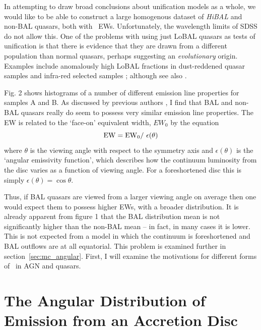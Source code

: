 In attempting to draw broad conclusions about unification models as a whole,
we would like to be able to construct a large homogenous dataset of 
{\em HiBAL} and non-BAL quasars, both with \oiiifull\ EWs. Unfortunately,
the wavelength limits of SDSS do not allow this. One of the problems with
using just LoBAL quasars as tests of unification is that there is evidence 
that they are drawn from a different population than normal quasars, perhaps
suggesting an {\em evolutionary} origin. Examples include anomalously 
high LoBAL fractions in dust-reddened quasar samples \citep{urrutia2009} 
and infra-red selected samples \citep{dai2012}; 
although see also \cite{lazarova2012}.


Fig. 2 shows histograms of a number of different 
emission line properties for samples A and B. 
As discussed by previous authors \cite[e.g.][]{weymann1991}, I find that BAL
and non-BAL quasars really do seem to possess very similar emission line 
properties. The EW is related to the `face-on' equivalent width,
$EW_0$ by the equation
\begin{equation}
{\rm EW} = {\rm EW}_0 /~\epsilon(\theta)
\end{equation}
where $\theta$ is the viewing angle with respect to the symmetry axis 
and $\epsilon(\theta)$ is the `angular emissivity function', which describes 
how the continuum luminosity from the disc varies as a function of viewing angle.
For a foreshortened disc this is simply $\epsilon(\theta) = \cos \theta$.

Thus, if BAL quasars are viewed from a larger viewing angle on average then one
would expect them to possess higher EWs, with a broader distribution.
It is already apparent from figure 1 that the BAL distribution mean 
is not significantly higher than the non-BAL
mean -- in fact, in many cases it is lower. This is not expected from a model
in which the continuum is foreshortened and BAL outflows are at all equatorial.
This problem is examined further in section~\ref{sec:mc_angular}. 
First, I will examine the motivations for different forms of \ept\ 
in AGN and quasars.

\section{The Angular Distribution of Emission from an Accretion Disc}
\label{sec:disc_agn}

